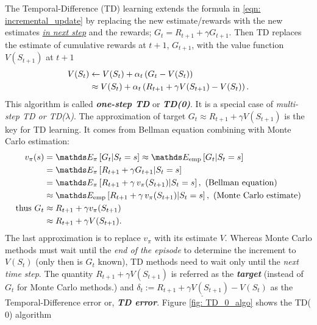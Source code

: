\documentclass[11pt]{article}
\begin{document}
The Temporal-Difference (TD) learning extends the formula in \eqref{eqn: incremental_update} by replacing the new estimate/rewards  with the new estimates \underline{\emph{in next step}} and the rewards; $G_{t} = R_{t+1}+ \gamma  G_{t+1}$. Then TD replaces the estimate of cumulative rewards at $t+1$, $G_{t+1}$, with the value function $V(S_{t+1})$ at $t+1$
\begin{align}
V(S_{t}) &\leftarrow V(S_{t}) + \alpha_{t}\left(G_{t} - V(S_{t})\right) \nonumber\\
&\approx V(S_{t}) + \alpha_{t}\left(R_{t+1} + \gamma V(S_{t+1})  - V(S_{t})\right). \label{eqn: incremental_update_td}
\end{align} This algorithm is called \textbf{\emph{one-step TD}} or \textbf{\emph{TD(0)}}. It is a special case of \emph{multi-step TD or TD($\lambda$)}. The approximation of target \underline{$G_{t} \approx R_{t+1} + \gamma V(S_{t+1})$} is the key for TD learning. It comes from Bellman equation combining with Monte Carlo estimation:
\begin{align}
v_{\pi}(s) &= \E{\pi}{G_{t} | S_{t} = s} \approx  \E{\text{emp}}{G_{t} | S_{t} = s}\nonumber\\
&=  \E{\pi}{ R_{t+1}+ \gamma G_{t+1} | S_{t} = s}\nonumber\\
&=\E{\pi}{R_{t+1}  + \gamma\,v_{\pi}(S_{t+1}) | S_{t} = s}, \text{ (Bellman equation)} \nonumber\\
&\approx \E{\text{emp}}{R_{t+1}  + \gamma\,v_{\pi}(S_{t+1}) | S_{t} = s}, \text{ (Monte Carlo estimate)} \nonumber\\
\text{thus }G_{t}&\approx R_{t+1}+  \gamma v_{\pi}(S_{t+1})\nonumber\\
&\approx R_{t+1}+  \gamma  V(S_{t+1}).
\end{align}The last approximation is to replace $v_{\pi}$ with its estimate $V$. Whereas Monte Carlo methods must wait until the \emph{end of the episode} to determine the increment to $V(S_t)$ (only then is $G_t$ known), TD methods need to wait only until the \emph{next time step}. The quantity \underline{$R_{t+1} + \gamma V(S_{t+1})$} is referred as the \emph{\textbf{target}} (instead of $G_{t}$ for Monte Carlo methods.) and $\underline{\delta_{t} := R_{t+1} + \gamma V(S_{t+1})  - V(S_{t})}$ as the Temporal-Difference error or, \textbf{\emph{TD error}}. Figure \ref{fig: TD_0_algo} shows the TD($0$) algorithm 
\end{document}
